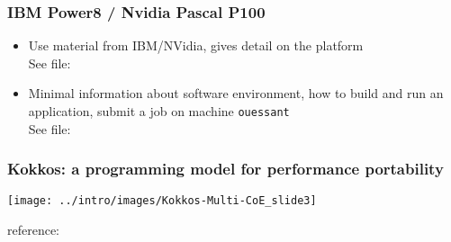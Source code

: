 \begin{frame}
  \frametitle{IBM Power8 / Nvidia Pascal P100}

  \begin{itemize}
  \item Use material from IBM/NVidia, gives detail on the platform\\
      See file: 
    \item Minimal information about software environment, how to build and run an application, submit a job on machine \texttt{ouessant}\\
      See file: 
  \end{itemize}

\end{frame}

\begin{frame}
  \frametitle{Kokkos: a programming model for performance portability}

  \begin{center}
    \texttt{[image: ../intro/images/Kokkos-Multi-CoE\_slide3]}
  \end{center}

  {\small reference: }

\end{frame}

